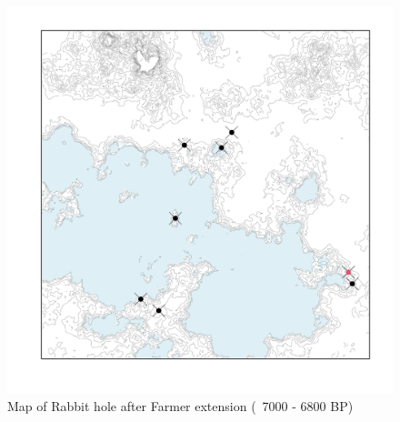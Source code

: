 \documentclass[10pt]{paper}
\begin{document}
\begin{figure}
    \centering
    \includegraphics[width=.65\textwidth]{newages}
    \caption{Map of Rabbit hole after Farmer extension  (~7000 - 6800 BP)  }
    \label{fig:oldage}
\end{figure}
\end{document}

